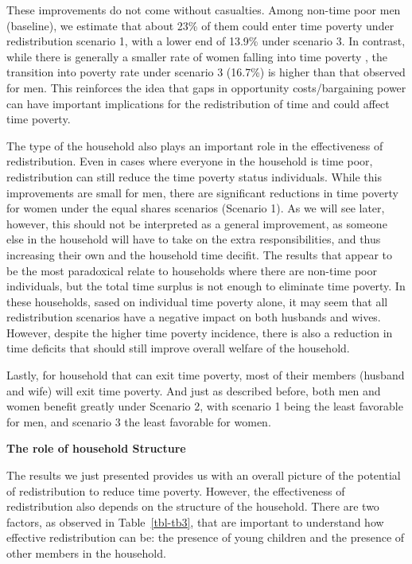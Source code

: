 \documentclass[
  11pt,
]{article}
\begin{document}
These improvements do not come without casualties. Among non-time poor
men (baseline), we estimate that about 23\% of them could enter time
poverty under redistribution scenario 1, with a lower end of 13.9\%
under scenario 3. In contrast, while there is generally a smaller rate
of women falling into time poverty , the transition into poverty rate
under scenario 3 (16.7\%) is higher than that observed for men. This
reinforces the idea that gaps in opportunity costs/bargaining power can
have important implications for the redistribution of time and could
affect time poverty.

The type of the household also plays an important role in the
effectiveness of redistribution. Even in cases where everyone in the
household is time poor, redistribution can still reduce the time poverty
status individuals. While this improvements are small for men, there are
significant reductions in time poverty for women under the equal shares
scenarios (Scenario 1). As we will see later, however, this should not
be interpreted as a general improvement, as someone else in the
household will have to take on the extra responsibilities, and thus
increasing their own and the household time decifit. The results that
appear to be the most paradoxical relate to households where there are
non-time poor individuals, but the total time surplus is not enough to
eliminate time poverty. In these households, sased on individual time
poverty alone, it may seem that all redistribution scenarios have a
negative impact on both husbands and wives. However, despite the higher
time poverty incidence, there is also a reduction in time deficits that
should still improve overall welfare of the household.

Lastly, for household that can exit time poverty, most of their members
(husband and wife) will exit time poverty. And just as described before,
both men and women benefit greatly under Scenario 2, with scenario 1
being the least favorable for men, and scenario 3 the least favorable
for women.

\textbf{The role of household Structure}

The results we just presented provides us with an overall picture of the
potential of redistribution to reduce time poverty. However, the
effectiveness of redistribution also depends on the structure of the
household. There are two factors, as observed in Table~\ref{tbl-tb3},
that are important to understand how effective redistribution can be:
the presence of young children and the presence of other members in the
household.
\end{document}
